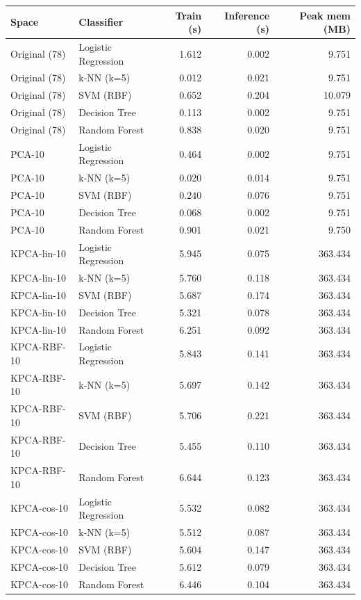 \begin{tabular}{llrrr}
\toprule
Space & Classifier & Train (s) & Inference (s) & Peak mem (MB) \\
\midrule
Original (78) & Logistic Regression & 1.612 & 0.002 & 9.751 \\
Original (78) & k-NN (k=5) & 0.012 & 0.021 & 9.751 \\
Original (78) & SVM (RBF) & 0.652 & 0.204 & 10.079 \\
Original (78) & Decision Tree & 0.113 & 0.002 & 9.751 \\
Original (78) & Random Forest & 0.838 & 0.020 & 9.751 \\
PCA-10 & Logistic Regression & 0.464 & 0.002 & 9.751 \\
PCA-10 & k-NN (k=5) & 0.020 & 0.014 & 9.751 \\
PCA-10 & SVM (RBF) & 0.240 & 0.076 & 9.751 \\
PCA-10 & Decision Tree & 0.068 & 0.002 & 9.751 \\
PCA-10 & Random Forest & 0.901 & 0.021 & 9.750 \\
KPCA-lin-10 & Logistic Regression & 5.945 & 0.075 & 363.434 \\
KPCA-lin-10 & k-NN (k=5) & 5.760 & 0.118 & 363.434 \\
KPCA-lin-10 & SVM (RBF) & 5.687 & 0.174 & 363.434 \\
KPCA-lin-10 & Decision Tree & 5.321 & 0.078 & 363.434 \\
KPCA-lin-10 & Random Forest & 6.251 & 0.092 & 363.434 \\
KPCA-RBF-10 & Logistic Regression & 5.843 & 0.141 & 363.434 \\
KPCA-RBF-10 & k-NN (k=5) & 5.697 & 0.142 & 363.434 \\
KPCA-RBF-10 & SVM (RBF) & 5.706 & 0.221 & 363.434 \\
KPCA-RBF-10 & Decision Tree & 5.455 & 0.110 & 363.434 \\
KPCA-RBF-10 & Random Forest & 6.644 & 0.123 & 363.434 \\
KPCA-cos-10 & Logistic Regression & 5.532 & 0.082 & 363.434 \\
KPCA-cos-10 & k-NN (k=5) & 5.512 & 0.087 & 363.434 \\
KPCA-cos-10 & SVM (RBF) & 5.604 & 0.147 & 363.434 \\
KPCA-cos-10 & Decision Tree & 5.612 & 0.079 & 363.434 \\
KPCA-cos-10 & Random Forest & 6.446 & 0.104 & 363.434 \\
\bottomrule
\end{tabular}
